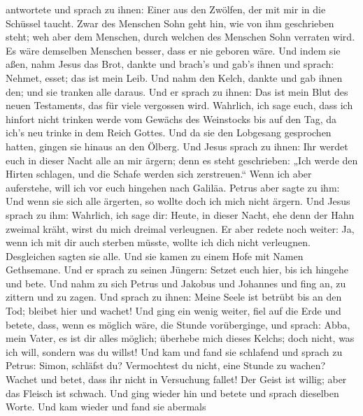 antwortete und sprach zu ihnen: Einer aus den Zwölfen, der mit mir in
die Schüssel taucht.  Zwar des Menschen Sohn geht hin,
wie von ihm geschrieben steht; weh aber dem Menschen, durch welchen des
Menschen Sohn verraten wird. Es wäre demselben Menschen besser, dass er
nie geboren wäre.  Und indem sie aßen, nahm Jesus das
Brot, dankte und brach's und gab's ihnen und sprach: Nehmet, esset; das
ist mein Leib.  Und nahm den Kelch, dankte und gab ihnen
den; und sie tranken alle daraus.  Und er sprach zu
ihnen: Das ist mein Blut des neuen Testaments, das für viele vergossen
wird.  Wahrlich, ich sage euch, dass ich hinfort nicht
trinken werde vom Gewächs des Weinstocks bis auf den Tag, da ich's neu
trinke in dem Reich Gottes.  Und da sie den Lobgesang
gesprochen hatten, gingen sie hinaus an den Ölberg.  Und
Jesus sprach zu ihnen: Ihr werdet euch in dieser Nacht alle an mir
ärgern; denn es steht geschrieben: „Ich werde den Hirten schlagen, und
die Schafe werden sich zerstreuen.``  Wenn ich aber
auferstehe, will ich vor euch hingehen nach Galiläa. 
Petrus aber sagte zu ihm: Und wenn sie sich alle ärgerten, so wollte
doch ich mich nicht ärgern.  Und Jesus sprach zu ihm:
Wahrlich, ich sage dir: Heute, in dieser Nacht, ehe denn der Hahn
zweimal kräht, wirst du mich dreimal verleugnen.  Er aber
redete noch weiter: Ja, wenn ich mit dir auch sterben müsste, wollte ich
dich nicht verleugnen. Desgleichen sagten sie alle.  Und
sie kamen zu einem Hofe mit Namen Gethsemane. Und er sprach zu seinen
Jüngern: Setzet euch hier, bis ich hingehe und bete.  Und
nahm zu sich Petrus und Jakobus und Johannes und fing an, zu zittern und
zu zagen.  Und sprach zu ihnen: Meine Seele ist betrübt
bis an den Tod; bleibet hier und wachet!  Und ging ein
wenig weiter, fiel auf die Erde und betete, dass, wenn es möglich wäre,
die Stunde vorüberginge,  und sprach: Abba, mein Vater,
es ist dir alles möglich; überhebe mich dieses Kelchs; doch nicht, was
ich will, sondern was du willst!  Und kam und fand sie
schlafend und sprach zu Petrus: Simon, schläfst du? Vermochtest du
nicht, eine Stunde zu wachen?  Wachet und betet, dass ihr
nicht in Versuchung fallet! Der Geist ist willig; aber das Fleisch ist
schwach.  Und ging wieder hin und betete und sprach
dieselben Worte.  Und kam wieder und fand sie abermals
